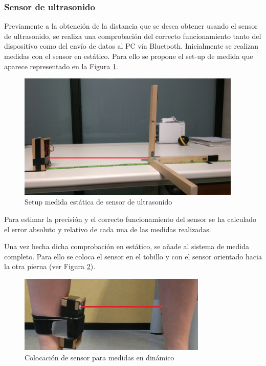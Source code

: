 \subsubsection{Sensor de ultrasonido}

	Previamente a la obtención de la distancia que se desea obtener usando el sensor de ultrasonido, se realiza una comprobación del correcto funcionamiento tanto del dispositivo como del envío de datos al PC vía Bluetooth. Inicialmente se realizan medidas con el sensor en estático. Para ello se propone el set-up de medida que aparece representado en la Figura  \ref{fig:ultrasonido}.
		
		 \begin{figure}[H]
		 	\centering
		 	\includegraphics[width=0.95\textwidth]{./graphics/ultrasonido}
		 	\caption{Setup medida estática de sensor de ultrasonido}\label{fig:ultrasonido}
		 \end{figure}

Para estimar la precisión y el correcto funcionamiento del sensor se ha calculado el error absoluto y relativo de cada una de las medidas realizadas.

Una vez hecha dicha comprobación en estático, se añade al sistema de medida completo. Para ello se coloca el sensor en el tobillo y con el sensor orientado hacia la otra pierna (ver Figura \ref{fig:ultracoloc}).
		
	 \begin{figure}[H]
	 	\centering
	 	\includegraphics[width=0.8\textwidth]{./graphics/coloc_ultr}
	 	\caption{Colocación de sensor para medidas en dinámico} \label{fig:ultracoloc}
	 \end{figure}
				
